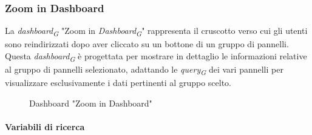\subsubsection{Zoom in Dashboard}
La \textit{dashboard}\textsubscript{\textit{G}} "Zoom in \textit{Dashboard}\textsubscript{\textit{G}}" rappresenta il cruscotto verso cui gli utenti sono reindirizzati dopo aver cliccato su un bottone di un gruppo di pannelli. Questa \textit{dashboard}\textsubscript{\textit{G}} è progettata per mostrare in dettaglio le informazioni relative al gruppo di pannelli selezionato, adattando le \textit{query}\textsubscript{\textit{G}} dei vari pannelli per visualizzare esclusivamente i dati pertinenti al gruppo scelto. 
\begin{figure}[H]
    \centering
    \caption{Dashboard "Zoom in Dashboard"}
    \label{fig:my_label}
\end{figure}

\paragraph{Variabili di ricerca}

